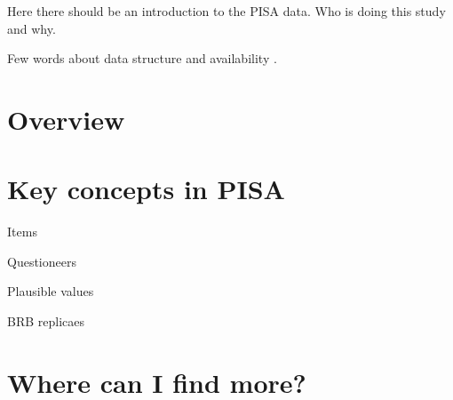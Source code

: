 Here there should be an introduction to the PISA data. Who is doing this study and why.

Few words about data structure and availability \cite{PISAwebsite} \cite{OECDwebsite}.

\section{Overview}

\section{Key concepts in PISA}

{Items}

{Questioneers}

{Plausible values}

{BRB replicaes}


\section{Where can I find more?}

